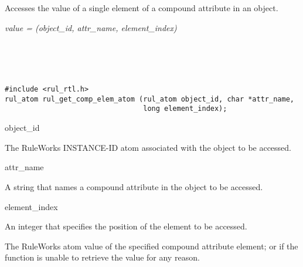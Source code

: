 \section*{}

Accesses the value of a single element of a compound attribute in an
object.

\Syntax

\it{value} = (\it{object\_id},
\it{attr\_name}, \it{element\_index})

\begin{args}
   \\
   \\
   \\
\end{args}

\CBinding
\begin{verbatim}
#include <rul_rtl.h>
rul_atom rul_get_comp_elem_atom (rul_atom object_id, char *attr_name, 
                                 long element_index);
\end{verbatim}

\begin{arguments}
\item[object\_id]

  The RuleWorks INSTANCE-ID atom associated with the object to be
  accessed.

\item[attr\_name]

  A string that names a compound attribute in the object to be
  accessed.

\item[element\_index]

  An integer that specifies the position of the element to be
  accessed.
\end{arguments}

\ReturnValue

The RuleWorks atom value of the specified compound attribute element;
or  if the function is unable to retrieve the value
for any reason.

\begin{seealso}



\end{seealso}

